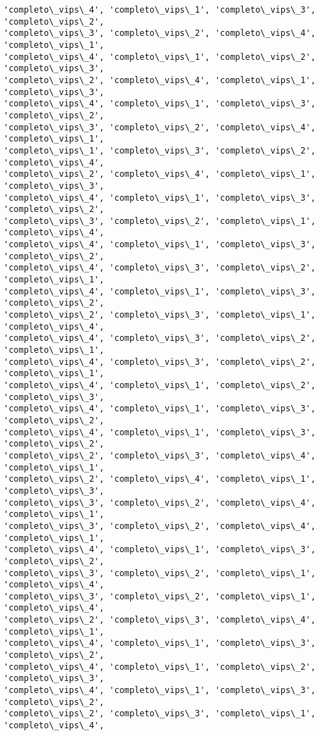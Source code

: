 \documentclass[11pt]{article}
\begin{document}
\begin{Verbatim}[commandchars=\\\{\}]
'completo\_vips\_4', 'completo\_vips\_1', 'completo\_vips\_3', 'completo\_vips\_2',
'completo\_vips\_3', 'completo\_vips\_2', 'completo\_vips\_4', 'completo\_vips\_1',
'completo\_vips\_4', 'completo\_vips\_1', 'completo\_vips\_2', 'completo\_vips\_3',
'completo\_vips\_2', 'completo\_vips\_4', 'completo\_vips\_1', 'completo\_vips\_3',
'completo\_vips\_4', 'completo\_vips\_1', 'completo\_vips\_3', 'completo\_vips\_2',
'completo\_vips\_3', 'completo\_vips\_2', 'completo\_vips\_4', 'completo\_vips\_1',
'completo\_vips\_1', 'completo\_vips\_3', 'completo\_vips\_2', 'completo\_vips\_4',
'completo\_vips\_2', 'completo\_vips\_4', 'completo\_vips\_1', 'completo\_vips\_3',
'completo\_vips\_4', 'completo\_vips\_1', 'completo\_vips\_3', 'completo\_vips\_2',
'completo\_vips\_3', 'completo\_vips\_2', 'completo\_vips\_1', 'completo\_vips\_4',
'completo\_vips\_4', 'completo\_vips\_1', 'completo\_vips\_3', 'completo\_vips\_2',
'completo\_vips\_4', 'completo\_vips\_3', 'completo\_vips\_2', 'completo\_vips\_1',
'completo\_vips\_4', 'completo\_vips\_1', 'completo\_vips\_3', 'completo\_vips\_2',
'completo\_vips\_2', 'completo\_vips\_3', 'completo\_vips\_1', 'completo\_vips\_4',
'completo\_vips\_4', 'completo\_vips\_3', 'completo\_vips\_2', 'completo\_vips\_1',
'completo\_vips\_4', 'completo\_vips\_3', 'completo\_vips\_2', 'completo\_vips\_1',
'completo\_vips\_4', 'completo\_vips\_1', 'completo\_vips\_2', 'completo\_vips\_3',
'completo\_vips\_4', 'completo\_vips\_1', 'completo\_vips\_3', 'completo\_vips\_2',
'completo\_vips\_4', 'completo\_vips\_1', 'completo\_vips\_3', 'completo\_vips\_2',
'completo\_vips\_2', 'completo\_vips\_3', 'completo\_vips\_4', 'completo\_vips\_1',
'completo\_vips\_2', 'completo\_vips\_4', 'completo\_vips\_1', 'completo\_vips\_3',
'completo\_vips\_3', 'completo\_vips\_2', 'completo\_vips\_4', 'completo\_vips\_1',
'completo\_vips\_3', 'completo\_vips\_2', 'completo\_vips\_4', 'completo\_vips\_1',
'completo\_vips\_4', 'completo\_vips\_1', 'completo\_vips\_3', 'completo\_vips\_2',
'completo\_vips\_3', 'completo\_vips\_2', 'completo\_vips\_1', 'completo\_vips\_4',
'completo\_vips\_3', 'completo\_vips\_2', 'completo\_vips\_1', 'completo\_vips\_4',
'completo\_vips\_2', 'completo\_vips\_3', 'completo\_vips\_4', 'completo\_vips\_1',
'completo\_vips\_4', 'completo\_vips\_1', 'completo\_vips\_3', 'completo\_vips\_2',
'completo\_vips\_4', 'completo\_vips\_1', 'completo\_vips\_2', 'completo\_vips\_3',
'completo\_vips\_4', 'completo\_vips\_1', 'completo\_vips\_3', 'completo\_vips\_2',
'completo\_vips\_2', 'completo\_vips\_3', 'completo\_vips\_1', 'completo\_vips\_4',

\end{Verbatim}
\end{document}
